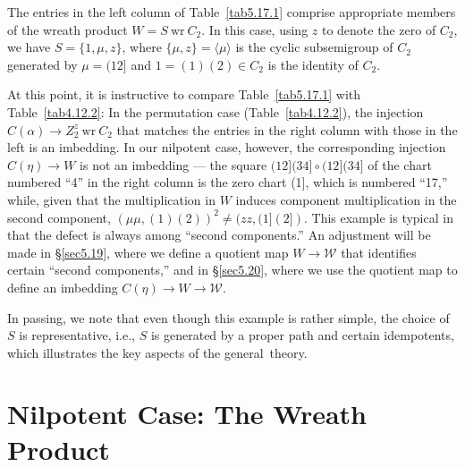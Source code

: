 \documentclass{surv-l}
\numberwithin{equation}{section}
\numberwithin{table}{section}
\numberwithin{figure}{section}
\theoremstyle{plain}
\theoremstyle{definition}
\begin{document}
The entries in the left column of Table~\ref{tab5.17.1} comprise
appropriate members of the wreath product $W=S\ \mathrm{wr}\
C_{2}$. In this case, using $z$ to denote the zero of $C_{2}$, we
have $S =\{1,\mu,z\}$, where $\{\mu,z\}=\langle\mu\rangle$ is the
cyclic subsemigroup of $C_{2}$ generated by $\mu=(12]$ and
$1=(1)(2)\in C_{2}$ is the identity of $C_{2}$.

At this point, it is instructive to compare Table~\ref{tab5.17.1}
with Table~\ref{tab4.12.2}: In the permutation case
(Table~\ref{tab4.12.2}), the injection $C(\alpha)\rightarrow
Z_{2}^{z}\ \mathrm{wr}\ C_{2}$ that matches the entries in the
right column with those in the left is an imbedding. In our
nilpotent case, however, the corresponding injection
$C(\eta)\rightarrow W$ is not an imbedding --- the square
$(12](34]\circ (12](34]$ of the chart numbered ``4'' in the right
column is the zero chart (1], which is numbered ``17,'' while,
given that the multiplication in $W$ induces component
multiplication in the second component, $(\mu\mu, (1)(2)
)^{2}\neq (zz, (1](2])$. This example is typical in that the
defect is always among ``second components.'' An adjustment will
be made in \S\ref{sec5.19}, where we define a quotient map
$W\rightarrow \mathcal{W}$ that identifies certain ``second
components,'' and in \S\ref{sec5.20}, where we use the quotient
map to define an imbedding $C(\eta)\rightarrow W\rightarrow
\mathcal{W}$.

In passing, we note that even though this example is rather
simple, the choice of $S$ is representative, i.e., $S$ is
generated by a proper path and certain idempotents, which
illustrates the key aspects of the general~theory.

\section{Nilpotent Case: The Wreath Product}\label{sec5.18}
\end{document}
